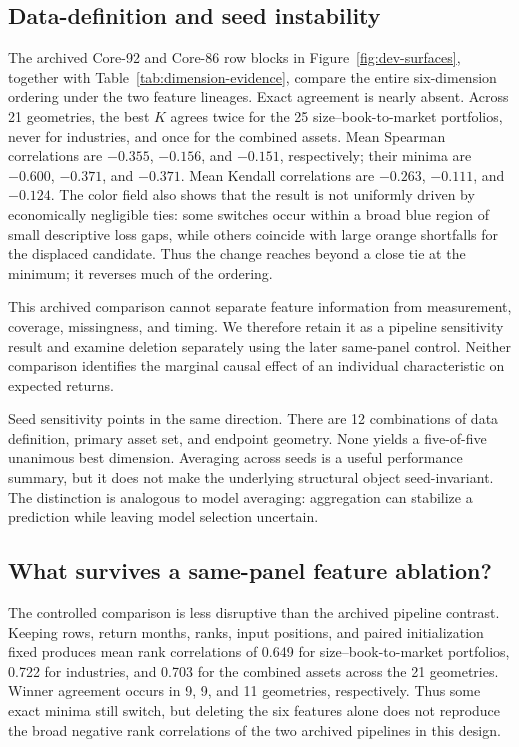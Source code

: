 \subsection{Data-definition and seed instability}

The archived Core-92 and Core-86 row blocks in Figure~\ref{fig:dev-surfaces}, together with Table~\ref{tab:dimension-evidence}, compare the entire six-dimension ordering under the two feature lineages. Exact agreement is nearly absent. Across 21 geometries, the best $K$ agrees twice for the 25 size--book-to-market portfolios, never for industries, and once for the combined assets. Mean Spearman correlations are $-0.355$, $-0.156$, and $-0.151$, respectively; their minima are $-0.600$, $-0.371$, and $-0.371$. Mean Kendall correlations are $-0.263$, $-0.111$, and $-0.124$. The color field also shows that the result is not uniformly driven by economically negligible ties: some switches occur within a broad blue region of small descriptive loss gaps, while others coincide with large orange shortfalls for the displaced candidate. Thus the change reaches beyond a close tie at the minimum; it reverses much of the ordering.

This archived comparison cannot separate feature information from measurement, coverage, missingness, and timing. We therefore retain it as a pipeline sensitivity result and examine deletion separately using the later same-panel control. Neither comparison identifies the marginal causal effect of an individual characteristic on expected returns.

Seed sensitivity points in the same direction. There are 12 combinations of data definition, primary asset set, and endpoint geometry. None yields a five-of-five unanimous best dimension. Averaging across seeds is a useful performance summary, but it does not make the underlying structural object seed-invariant. The distinction is analogous to model averaging: aggregation can stabilize a prediction while leaving model selection uncertain.

\subsection{What survives a same-panel feature ablation?}

The controlled comparison is less disruptive than the archived pipeline contrast. Keeping rows, return months, ranks, input positions, and paired initialization fixed produces mean rank correlations of 0.649 for size--book-to-market portfolios, 0.722 for industries, and 0.703 for the combined assets across the 21 geometries. Winner agreement occurs in 9, 9, and 11 geometries, respectively. Thus some exact minima still switch, but deleting the six features alone does not reproduce the broad negative rank correlations of the two archived pipelines in this design.

